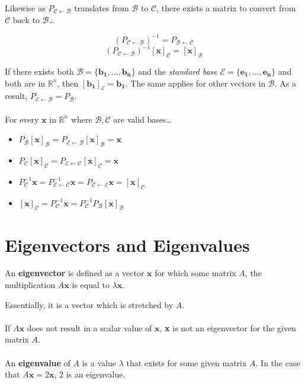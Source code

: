 \documentclass[12pt]{article}
\newcommand{\R}{\mathbb{R}}
\newcommand{\bt}[1]{\textbf{{#1}}}
\newcommand{\bm}[1]{\mathbf{{#1}}}
\newcommand{\mmc}[1]{\mathcal{{#1}}}
\newcommand{\set}[1]{\{{#1}\}}
\begin{document}
Likewise as $P_{\mmc{C} \leftarrow \mmc{B}}$ translates from $\mmc{B}$ to $\mmc{C}$, there exists a matrix to
convert from $\mmc{C}$ back to $\mmc{B}$\dots

$$(P_{\mmc{C} \leftarrow \mmc{B}})^{-1} = P_{\mmc{B} \leftarrow \mmc{C}}$$
$$(P_{\mmc{C} \leftarrow \mmc{B}})^{-1}[\bm{x}]_\mmc{C} = [\bm{x}]_\mmc{B}$$

If there exists both $\mmc{B} = \set{\bm{b_1,\dots,b_n}}$ and the \emph{standard base} $\mmc{E} = \set{\bm{e_1,\dots,e_n}}$ and both are in $\R^n$,
then $[\bm{b_1}]_{\mmc{E}} = \bm{b_1}$. The same applies for other vectors in $\mmc{B}$. As a result, $P_{\mmc{E} \leftarrow \mmc{B}} = P_\mmc{B}$. \\ \\

For every $\bm{x}$ in $\R^n$ where $\mmc{B}, \mmc{C}$ are valid bases\dots

\begin{itemize}
    \item $P_\mmc{B}[\bm{x}]_\mmc{B} = P_\mmc{E  \leftarrow B}[\bm{x}]_\mmc{B} = \bm{x}$
    \item $P_\mmc{C}[\bm{x}]_\mmc{C} = P_\mmc{E \leftarrow C}[\bm{x}]_\mmc{C} = \bm{x}$
    \item $P_\mmc{C}^{-1}\bm{x} = P_\mmc{E \leftarrow C}^{-1}\bm{x} = P_\mmc{C \leftarrow E}\bm{x} = [\bm{x}]_\mmc{C}$
    \item $[\bm{x}]_\mmc{C} = P_\mmc{C}^{-1}\bm{x} = P_\mmc{C}^{-1}P_\mmc{B}[\bm{x}]_\mmc{B}$
\end{itemize}

\section*{Eigenvectors and Eigenvalues}

An \bt{eigenvector} is defined as a vector $\bm{x}$ for which some matrix $A$,
the multiplication $A\bm{x}$ is equal to $\lambda \bm{x}$.

Essentially, it is a vector which is stretched by $A$. \\ \\

If $A\bm{x}$ does not result in a scalar value of $\bm{x}$, \bt{x} is
not an eigenvector for the given matrix $A$. \\ \\

An \bt{eigenvalue} of $A$ is a value $\lambda$ that exists for some
given matrix $A$. In the case that $A\bm{x} = 2\bm{x}$, $2$ is an eigenvalue. \\ \\
\end{document}
